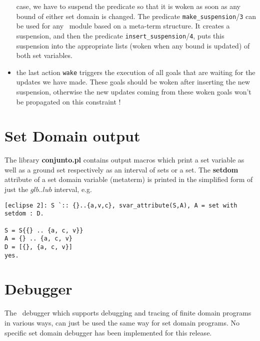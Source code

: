 \begin{itemize}
case, we have to suspend the predicate so that it is woken as soon as
any bound of either set domain is changed. The predicate
\verb/make_suspension//\verb/3/ can be used for any \eclipse\ module
based on a meta-term structure. It creates a suspension, and then the
predicate \verb/insert_suspension//\verb/4/, puts this suspension into
the appropriate lists (woken when any bound is updated) of both set
variables.
\item the last action \verb/wake/ triggers the execution of all goals that are
waiting for the updates we have made. These goals should be woken
after inserting the new suspension, otherwise the new updates coming
from these woken goals won't be propagated on this constraint !
\end{itemize}
\section{Set Domain output}

The library {\bf conjunto.pl} contains output macros which print a set
variable as well as a ground set respectively as an interval of sets or
a set. The {\bf setdom} attribute of a set domain variable (metaterm)
is printed in the simplified form of just the $glb..lub$ interval, e.g.

\begin{verbatim}
[eclipse 2]: S `:: {}..{a,v,c}, svar_attribute(S,A), A = set with setdom : D.

S = S{{} .. {a, c, v}}
A = {} .. {a, c, v}
D = [{}, {a, c, v}]
yes.
\end{verbatim}

\section{Debugger}

The \eclipse\ debugger which supports debugging and tracing of finite
domain programs in various ways, can just be used the same way for set
domain programs. No specific set domain debugger has been implemented
for this release. 

\begin{latexonly}
\disableunderscores
\end{latexonly}


